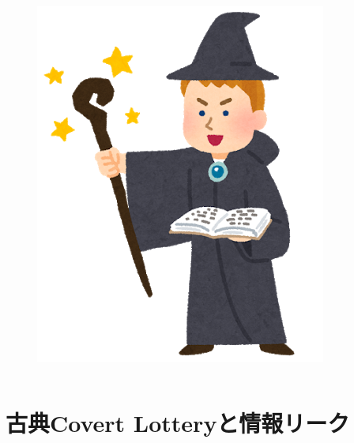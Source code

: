 \begin{frame}
\begin{columns}
\begin{column}{0.5\textwidth}
      \begin{figure}[h]
        \includegraphics[height=0.35\textheight]{img/bob.png}
      \end{figure}
    \end{column}
  \end{columns}
\end{frame}

\section{古典Covert Lotteryと情報リーク}

